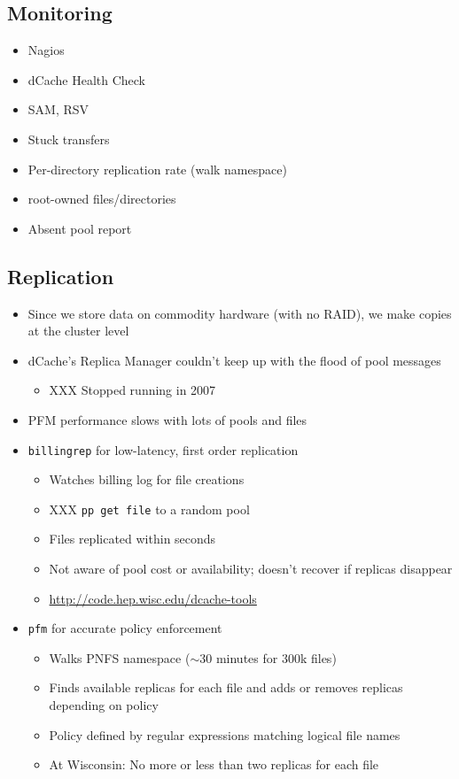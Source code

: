 \documentclass{beamer}
\newcommand{\ca}{\ensuremath{\sim}}
\begin{document}
\subsection{Monitoring}
\begin{frame}
\begin{itemize}
	\item Nagios
	\item dCache Health Check
	\item SAM, RSV
	\item Stuck transfers
	\item Per-directory replication rate (walk namespace)
	\item root-owned files/directories
	\item Absent pool report
\end{itemize}
\end{frame}

\subsection{Replication}
\begin{frame}
\begin{itemize}
	\item Since we store data on commodity hardware (with no RAID), we make copies at the cluster level
	\item dCache's Replica Manager couldn't keep up with the flood of pool messages
	\begin{itemize}
		\item XXX Stopped running in 2007
	\end{itemize}
	\item PFM performance slows with lots of pools and files
	\item {\tt billingrep} for low-latency, first order replication
	\begin{itemize}
		\item Watches billing log for file creations
		\item XXX {\tt pp get file} to a random pool
		\item Files replicated within seconds
		\item Not aware of pool cost or availability; doesn't recover if replicas disappear
		\item \url{http://code.hep.wisc.edu/dcache-tools}
	\end{itemize}
	\item {\tt pfm} for accurate policy enforcement
	\begin{itemize}
		\item Walks PNFS namespace (\ca{}30 minutes for 300k files)
		\item Finds available replicas for each file and adds or removes replicas depending on policy
		\item Policy defined by regular expressions matching logical file names
		\item At Wisconsin: No more or less than two replicas for each file
	\end{itemize}
\end{itemize}
\end{frame}
\end{document}
